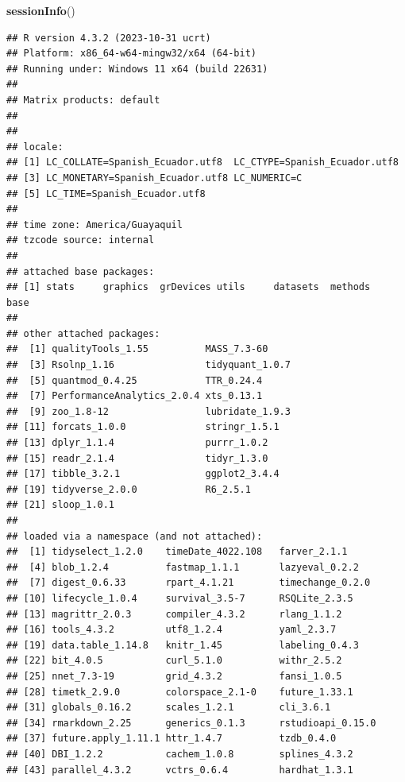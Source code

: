 \documentclass[
]{book}
\newenvironment{Shaded}{\begin{snugshade}}{\end{snugshade}}
\newcommand{\FunctionTok}[1]{\textcolor[rgb]{0.13,0.29,0.53}{\textbf{#1}}}
\newcommand{\NormalTok}[1]{#1}
\begin{document}
\begin{Shaded}
\begin{Highlighting}[]
\FunctionTok{sessionInfo}\NormalTok{()}
\end{Highlighting}
\end{Shaded}

\begin{verbatim}
## R version 4.3.2 (2023-10-31 ucrt)
## Platform: x86_64-w64-mingw32/x64 (64-bit)
## Running under: Windows 11 x64 (build 22631)
## 
## Matrix products: default
## 
## 
## locale:
## [1] LC_COLLATE=Spanish_Ecuador.utf8  LC_CTYPE=Spanish_Ecuador.utf8   
## [3] LC_MONETARY=Spanish_Ecuador.utf8 LC_NUMERIC=C                    
## [5] LC_TIME=Spanish_Ecuador.utf8    
## 
## time zone: America/Guayaquil
## tzcode source: internal
## 
## attached base packages:
## [1] stats     graphics  grDevices utils     datasets  methods   base     
## 
## other attached packages:
##  [1] qualityTools_1.55          MASS_7.3-60               
##  [3] Rsolnp_1.16                tidyquant_1.0.7           
##  [5] quantmod_0.4.25            TTR_0.24.4                
##  [7] PerformanceAnalytics_2.0.4 xts_0.13.1                
##  [9] zoo_1.8-12                 lubridate_1.9.3           
## [11] forcats_1.0.0              stringr_1.5.1             
## [13] dplyr_1.1.4                purrr_1.0.2               
## [15] readr_2.1.4                tidyr_1.3.0               
## [17] tibble_3.2.1               ggplot2_3.4.4             
## [19] tidyverse_2.0.0            R6_2.5.1                  
## [21] sloop_1.0.1               
## 
## loaded via a namespace (and not attached):
##  [1] tidyselect_1.2.0    timeDate_4022.108   farver_2.1.1       
##  [4] blob_1.2.4          fastmap_1.1.1       lazyeval_0.2.2     
##  [7] digest_0.6.33       rpart_4.1.21        timechange_0.2.0   
## [10] lifecycle_1.0.4     survival_3.5-7      RSQLite_2.3.5      
## [13] magrittr_2.0.3      compiler_4.3.2      rlang_1.1.2        
## [16] tools_4.3.2         utf8_1.2.4          yaml_2.3.7         
## [19] data.table_1.14.8   knitr_1.45          labeling_0.4.3     
## [22] bit_4.0.5           curl_5.1.0          withr_2.5.2        
## [25] nnet_7.3-19         grid_4.3.2          fansi_1.0.5        
## [28] timetk_2.9.0        colorspace_2.1-0    future_1.33.1      
## [31] globals_0.16.2      scales_1.2.1        cli_3.6.1          
## [34] rmarkdown_2.25      generics_0.1.3      rstudioapi_0.15.0  
## [37] future.apply_1.11.1 httr_1.4.7          tzdb_0.4.0         
## [40] DBI_1.2.2           cachem_1.0.8        splines_4.3.2      
## [43] parallel_4.3.2      vctrs_0.6.4         hardhat_1.3.1      

\end{verbatim}
\end{document}
